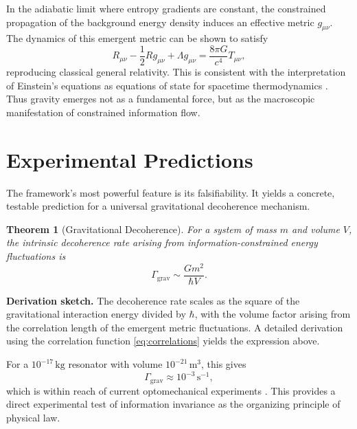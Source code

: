 \documentclass[prd,10pt,twocolumn]{revtex4-2}
\newtheorem{theorem}{Theorem}[section]
\begin{document}
In the adiabatic limit where entropy gradients are constant, the constrained propagation of the background energy density induces an effective metric $g_{\mu\nu}$. The dynamics of this emergent metric can be shown to satisfy
\begin{equation}
R_{\mu\nu} - \frac{1}{2}R g_{\mu\nu} + \Lambda g_{\mu\nu} = \frac{8\pi G}{c^4} T_{\mu\nu}, \label{eq:einstein}
\end{equation}
reproducing classical general relativity. This is consistent with the interpretation of Einstein's equations as equations of state for spacetime thermodynamics \cite{Jacobson1995}. Thus gravity emerges not as a fundamental force, but as the macroscopic manifestation of constrained information flow.

\section{Experimental Predictions}
\label{sec:predictions}

The framework's most powerful feature is its falsifiability. It yields a concrete, testable prediction for a universal gravitational decoherence mechanism.

\begin{theorem}[Gravitational Decoherence]
For a system of mass $m$ and volume $V$, the intrinsic decoherence rate arising from information-constrained energy fluctuations is
\begin{equation}
\Gamma_{\mathrm{grav}} \sim \frac{G m^2}{\hbar V}. \label{eq:decoherence}
\end{equation}
\end{theorem}

\textbf{Derivation sketch.} The decoherence rate scales as the square of the gravitational interaction energy divided by $\hbar$, with the volume factor arising from the correlation length of the emergent metric fluctuations. A detailed derivation using the correlation function \eqref{eq:correlations} yields the expression above.

For a $10^{-17}\,\mathrm{kg}$ resonator with volume $10^{-21}\,\mathrm{m}^3$, this gives
\begin{equation}
\Gamma_{\mathrm{grav}} \approx 10^{-3}\,\mathrm{s}^{-1}, \label{eq:decoherence_numerical}
\end{equation}
which is within reach of current optomechanical experiments \cite{Aspelmeyer2014}. This provides a direct experimental test of information invariance as the organizing principle of physical law.
\end{document}
